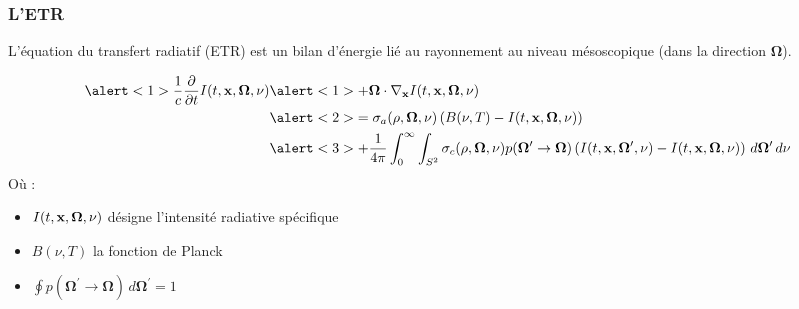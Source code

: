 \begin{frame}
  \frametitle{L'ETR}
  L'équation du transfert radiatif (ETR) est un bilan d'énergie lié au rayonnement au niveau mésoscopique (dans la direction $\bm{\Omega}$). 

  \begingroup
  \scriptsize
  \begin{gather*}
      \begin{aligned}
        \alert<1>{\frac{1}{c} \frac{\partial}{\partial t}I(t,\bvec{x},\bm{\Omega},\nu)} &\alert<1>{+\bm{\Omega}\cdot\nabla_{\bvec{x}} I(t,\bvec{x},\bm{\Omega},\nu)} \\
      &\alert<2>{= \sigma_a(\rho,\bm{\Omega},\nu)\left(B(\nu,T)-I(t,\bvec{x},\bm{\Omega},\nu)\right)} \\
      &\alert<3>{+ \frac{1}{4\pi} \int_{0}^{\infty} \int_{S^2}\sigma_c(\rho,\bm{\Omega},\nu)p(\bm{\Omega}^\prime\rightarrow\bm{\Omega})\left(I(t,\bvec{x},\bm{\Omega}^\prime,\nu)-I(t,\bvec{x},\bm{\Omega},\nu)\right) \, d\bm{\Omega}^\prime \, d\nu}
      \end{aligned}
  \end{gather*}
  \endgroup
Où :
\begin{itemize}
  \item $I(t,\textbf{x},\bm{\Omega},\nu)$ désigne l'intensité radiative spécifique
  \item $B(\nu,T)$ la fonction de Planck
  \item $\oint p(\bm{\Omega}^\prime\rightarrow\bm{\Omega})\, d\bm{\Omega}^\prime=1$
\end{itemize}

\end{frame}

